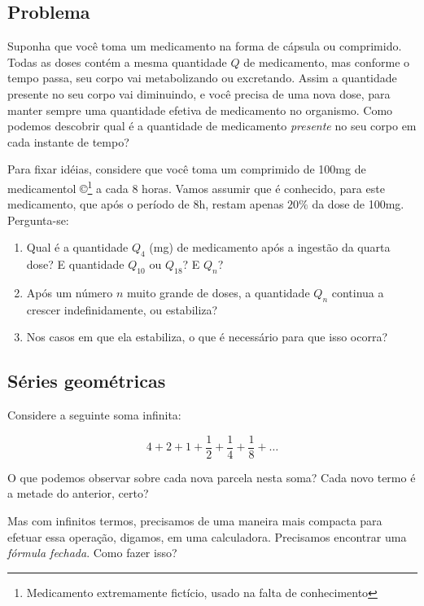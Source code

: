 \documentclass[a4paper]{article}
\begin{document}
\subsection{Problema}
\label{sec:problema}

Suponha que você toma um medicamento na forma de cápsula ou
comprimido. Todas as doses contém a mesma quantidade $Q$ de
medicamento, mas conforme o tempo passa, seu corpo vai metabolizando
ou excretando. Assim a quantidade presente no seu corpo vai
diminuindo, e você precisa de uma nova dose, para manter sempre uma
quantidade efetiva de medicamento no organismo. Como podemos descobrir
qual é a quantidade de medicamento {\em presente} no seu corpo em cada
instante de tempo?

Para fixar idéias, considere que você toma um comprimido de 100mg de
medicamentol \copyright\footnote{Medicamento extremamente fictício,
  usado na falta de conhecimento} a cada 8 horas. Vamos assumir que é
conhecido, para este medicamento, que após o período de 8h, restam
apenas $20\%$ da dose de 100mg. Pergunta-se:

\begin{enumerate}
\item Qual é a quantidade $Q_4$ (mg) de medicamento após a ingestão da
  quarta dose? E quantidade $Q_{10}$ ou $Q_{18}$? E $Q_n$?
\item Após um número $n$ muito grande de doses, a quantidade $Q_n$
  continua a crescer indefinidamente, ou estabiliza?
\item Nos casos em que ela estabiliza, o que é necessário para que
  isso ocorra?
\end{enumerate}

\subsection{Séries geométricas}

Considere a seguinte soma infinita:

\begin{displaymath}
  4+ 2+ 1+ \frac{1}{2} +\frac{1}{4} + \frac{1}{8} + \ldots
\end{displaymath}

O que podemos observar sobre cada nova parcela nesta soma? Cada novo
termo é a metade do anterior, certo?

Mas com infinitos termos, precisamos de uma maneira mais compacta para
efetuar essa operação, digamos, em uma calculadora. Precisamos
encontrar uma {\em fórmula fechada}. Como fazer isso?
\end{document}

